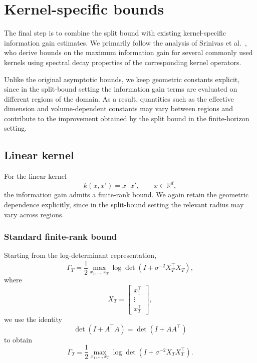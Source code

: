 
\section{Kernel-specific bounds}

The final step is to combine the split bound with existing kernel-specific
information gain estimates. We primarily follow the analysis of
Srinivas et al.~\cite{Srinivas2009}, who derive bounds on the maximum
information gain for several commonly used kernels using spectral decay
properties of the corresponding kernel operators. 

Unlike the original asymptotic bounds, we keep geometric constants explicit,
since in the split-bound setting the information gain terms are evaluated
on different regions of the domain. As a result, quantities such as the
effective dimension and volume-dependent constants may vary between
regions and contribute to the improvement obtained by the split bound in the finite-horizon setting.

\subsection{Linear kernel}

For the linear kernel
\begin{equation*}
k(x,x')
=
x^\top x',
\qquad
x\in\mathbb R^d,
\end{equation*}
the information gain admits a finite-rank bound. We again retain the geometric dependence explicitly, since in the split-bound setting the relevant radius may vary across regions.

\subsubsection{Standard finite-rank bound}

Starting from the log-determinant representation,
\begin{equation*}
\Gamma_T
=
\frac12
\max_{x_1,\dots,x_T}
\log\det
\left(
I+\sigma^{-2}X_T^\top X_T
\right),
\end{equation*}
where
\begin{equation*}
X_T
=
\begin{bmatrix}
x_1^\top \\
\vdots \\
x_T^\top
\end{bmatrix},
\end{equation*}
we use the identity
\begin{equation*}
\det(I+A^\top A)
=
\det(I+AA^\top)
\end{equation*}
to obtain
\begin{equation*}
\Gamma_T
=
\frac12
\max_{x_1,\dots,x_T}
\log\det
\left(
I+\sigma^{-2}X_TX_T^\top
\right).
\end{equation*}

